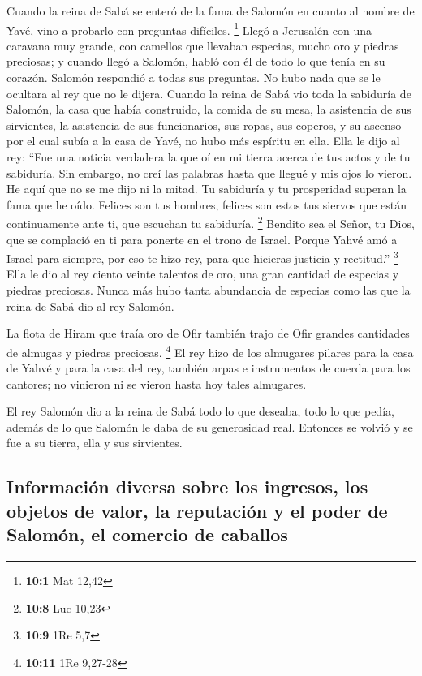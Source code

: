  Cuando la reina de Sabá se enteró de la fama de Salomón
en cuanto al nombre de Yavé, vino a probarlo con preguntas difíciles.
\footnote{\textbf{10:1} Mat 12,42}  Llegó a Jerusalén con
una caravana muy grande, con camellos que llevaban especias, mucho oro y
piedras preciosas; y cuando llegó a Salomón, habló con él de todo lo que
tenía en su corazón.  Salomón respondió a todas sus
preguntas. No hubo nada que se le ocultara al rey que no le dijera.
 Cuando la reina de Sabá vio toda la sabiduría de Salomón,
la casa que había construido,  la comida de su mesa, la
asistencia de sus sirvientes, la asistencia de sus funcionarios, sus
ropas, sus coperos, y su ascenso por el cual subía a la casa de Yavé, no
hubo más espíritu en ella.  Ella le dijo al rey: ``Fue una
noticia verdadera la que oí en mi tierra acerca de tus actos y de tu
sabiduría.  Sin embargo, no creí las palabras hasta que
llegué y mis ojos lo vieron. He aquí que no se me dijo ni la mitad. Tu
sabiduría y tu prosperidad superan la fama que he oído. 
Felices son tus hombres, felices son estos tus siervos que están
continuamente ante ti, que escuchan tu sabiduría. \footnote{\textbf{10:8}
  Luc 10,23}  Bendito sea el Señor, tu Dios, que se
complació en ti para ponerte en el trono de Israel. Porque Yahvé amó a
Israel para siempre, por eso te hizo rey, para que hicieras justicia y
rectitud.'' \footnote{\textbf{10:9} 1Re 5,7}  Ella le dio
al rey ciento veinte talentos de oro, una gran cantidad de especias y
piedras preciosas. Nunca más hubo tanta abundancia de especias como las
que la reina de Sabá dio al rey Salomón.

 La flota de Hiram que traía oro de Ofir también trajo de
Ofir grandes cantidades de almugas y piedras preciosas. \footnote{\textbf{10:11}
  1Re 9,27-28}  El rey hizo de los almugares pilares para
la casa de Yahvé y para la casa del rey, también arpas e instrumentos de
cuerda para los cantores; no vinieron ni se vieron hasta hoy tales
almugares.

 El rey Salomón dio a la reina de Sabá todo lo que
deseaba, todo lo que pedía, además de lo que Salomón le daba de su
generosidad real. Entonces se volvió y se fue a su tierra, ella y sus
sirvientes.

\hypertarget{informaciuxf3n-diversa-sobre-los-ingresos-los-objetos-de-valor-la-reputaciuxf3n-y-el-poder-de-salomuxf3n-el-comercio-de-caballos}{%
\subsection{Información diversa sobre los ingresos, los objetos de
valor, la reputación y el poder de Salomón, el comercio de
caballos}\label{informaciuxf3n-diversa-sobre-los-ingresos-los-objetos-de-valor-la-reputaciuxf3n-y-el-poder-de-salomuxf3n-el-comercio-de-caballos}}


